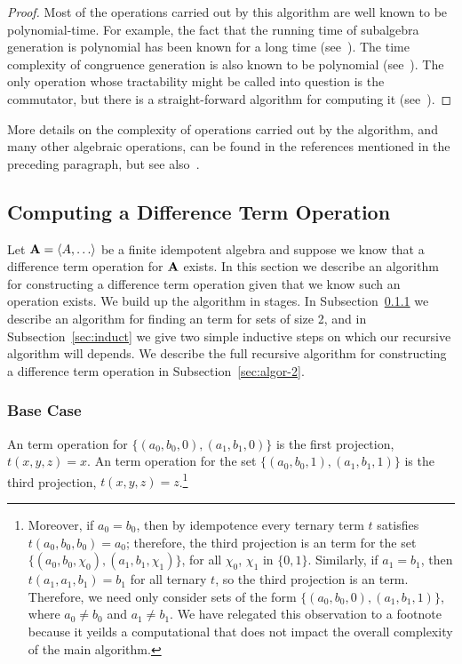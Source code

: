 \begin{proof}
    Most of the operations carried out by this algorithm are well known to be
    polynomial-time.  For example, the fact that the running time of 
    subalgebra generation is polynomial has been known for a long time (see~\cite{MR0455543}).
    The time complexity of congruence generation is also known to be polynomial
    (see~\cite{MR2470585}).  The only operation whose tractability might be
    called into question is the commutator, but there is a straight-forward
    algorithm for computing it (see~\cite{2017arXiv170302764D}).
\end{proof}


More details on the complexity of operations carried out by the algorithm, and
many other algebraic operations, can be found in the references mentioned in the preceding paragraph, but see also~\cite{MR1871085,MR1695293,Freese:2009}.

\subsection{Computing a Difference Term Operation}
Let $\alg{A} = \<A, \dots\>$ be a finite idempotent algebra and suppose we 
know that a difference term operation for $\mathbf{A}$ exists.  In this section we
describe an algorithm for constructing a difference term operation given that 
we know such an operation exists. 
We build up the algorithm in stages. In Subsection~\ref{sec:size2} we
describe an algorithm for finding an \ld term for sets of size 2, and 
in Subsection~\ref{sec:induct} we give two simple inductive steps 
on which our recursive algorithm will depends.
We describe the full recursive algorithm for constructing a difference term 
operation in Subsection~\ref{sec:algor-2}.

\subsubsection{Base Case}
\label{sec:size2}
An \ld term operation for 
$\{(a_0,b_0,0), (a_1, b_1, 0)\}$ is the first projection,
$t(x,y,z) = x$.
An \ld term operation for
the set $\{(a_0,b_0,1), (a_1, b_1, 1)\}$ is the third projection,
$t(x,y,z) = z$.\footnote{Moreover, if $a_0 = b_0$, then by idempotence every ternary term $t$ 
satisfies $t(a_0, b_0, b_0) = a_0$; therefore, the third projection is an \ld 
term for the set $\{(a_0,b_0,\chi_0), (a_1, b_1, \chi_1)\}$, 
for all $\chi_0$, $\chi_1$ in $\{0,1\}$. 
Similarly, if $a_1 = b_1$, then $t(a_1, a_1, b_1) = b_1$ for all ternary $t$, 
so the third projection is an \ld term.
Therefore, we need only consider sets of the form
$\{(a_0,b_0, 0), (a_1, b_1, 1)\}$, where $a_0 \neq b_0$ and 
$a_1 \neq b_1$.  
We have relegated this observation to a footnote because it yeilds a computational 
that does not impact the overall complexity of the main algorithm.} 


